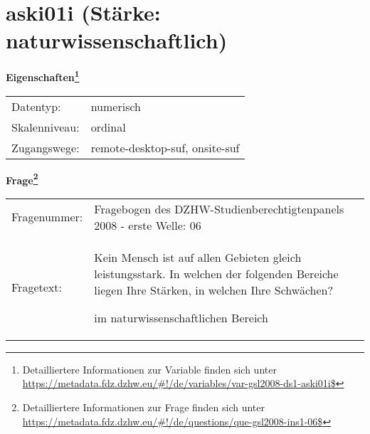 
    \setcounter{footnote}{0}

    \vspace*{-1.8cm}
	\section{aski01i (Stärke: naturwissenschaftlich)}
	\label{section:aski01i}



    \vspace*{0.5cm}
    \noindent\textbf{Eigenschaften\footnote{Detailliertere Informationen zur Variable finden sich unter
		\url{https://metadata.fdz.dzhw.eu/\#!/de/variables/var-gsl2008-ds1-aski01i$}}}\\
	\begin{tabularx}{\hsize}{@{}lX}
	Datentyp: & numerisch \\
	Skalenniveau: & ordinal \\
	Zugangswege: &
	  remote-desktop-suf, 
	  onsite-suf
 \\
    \end{tabularx}



				\vspace*{0.5cm}
                \noindent\textbf{Frage\footnote{Detailliertere Informationen zur Frage finden sich unter
		              \url{https://metadata.fdz.dzhw.eu/\#!/de/questions/que-gsl2008-ins1-06$}}}\\
				\begin{tabularx}{\hsize}{@{}lX}
					Fragenummer: &
					  Fragebogen des DZHW-Studienberechtigtenpanels 2008 - erste Welle:
					  06
 \\
					Fragetext: & Kein Mensch ist auf allen Gebieten gleich leistungsstark. In welchen der folgenden Bereiche liegen Ihre Stärken, in welchen Ihre Schwächen?\par  im naturwissenschaftlichen Bereich \\
				\end{tabularx}






